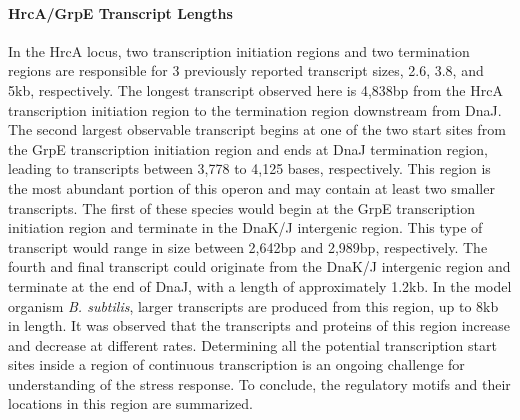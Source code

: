 \paragraph{HrcA/GrpE Transcript Lengths}
In the HrcA locus, two transcription initiation regions and two termination regions are responsible for 3 previously reported transcript sizes, 2.6, 3.8, and 5kb, respectively. The longest transcript observed here is 4,838bp from the HrcA transcription initiation region to the termination region downstream from DnaJ. The second largest observable transcript begins at one of the two start sites from the GrpE transcription initiation region and ends at DnaJ termination region, leading to transcripts between 3,778 to 4,125 bases, respectively. This region is the most abundant portion of this operon and may contain at least two smaller transcripts. The first of these species would begin at the GrpE transcription initiation region and terminate in the DnaK/J intergenic region. This type of transcript would range in size between 2,642bp and 2,989bp, respectively. The fourth and final transcript could originate from the DnaK/J intergenic region and terminate at the end of DnaJ, with a length of approximately 1.2kb. In the model organism \textit{B. subtilis}, larger transcripts are produced from this region, up to 8kb in length\cite{81}. It was observed that the transcripts and proteins of this region increase and decrease at different rates\cite{81}. Determining all the potential transcription start sites inside a region of continuous transcription is an ongoing challenge for understanding of the stress response. To conclude, the regulatory motifs and their locations in this region are summarized.

